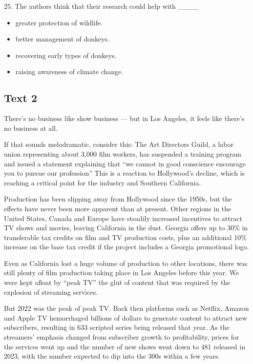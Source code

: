 \documentclass[UTF8,11pt]{ctexart}
\begin{document}
25. The authors think that their research could help with \_\_\_\_


\begin{itemize}[leftmargin=2em,itemsep=.2em,topsep=.4em]\item[A.] greater protection of wildlife.
\item[B.] better management of donkeys.
\item[C.] recovering early types of donkeys.
\item[D.] raising awareness of climate change.
\end{itemize}

\subsection*{\textbf{Text 2}}


There’s no business like show business — but in Los Angeles, it feels like there’s no business at all.


If that sounds melodramatic, consider this: The Art Directors Guild, a labor union representing about 3,000 film workers, has suspended a training program and issued a statement explaining that “we cannot in good conscience encourage you to pursue our profession” This is a reaction to Hollywood’s decline, which is reaching a critical point for the industry and Southern California.


Production has been slipping away from Hollywood since the 1950s, but the effects have never been more apparent than at present. Other regions in the United States, Canada and Europe have steadily increased incentives to attract TV shows and movies, leaving California in the dust. Georgia offers up to 30\% in transferable tax credits on film and TV production costs, plus an additional 10\% increase on the base tax credit if the project includes a Georgia promotional logo.


Even as California lost a huge volume of production to other locations, there was still plenty of film production taking place in Los Angeles before this year. We were kept afloat by “peak TV” the glut of content that was required by the explosion of streaming services.


But 2022 was the peak of peak TV. Back then platforms such as Netflix, Amazon and Apple TV hemorrhaged billions of dollars to generate content to attract new subscribers, resulting in 633 scripted series being released that year. As the streamers’ emphasis changed from subscriber growth to profitability, prices for the services went up and the number of new shows went down to 481 released in 2023, with the number expected to dip into the 300s within a few years.
\end{document}
